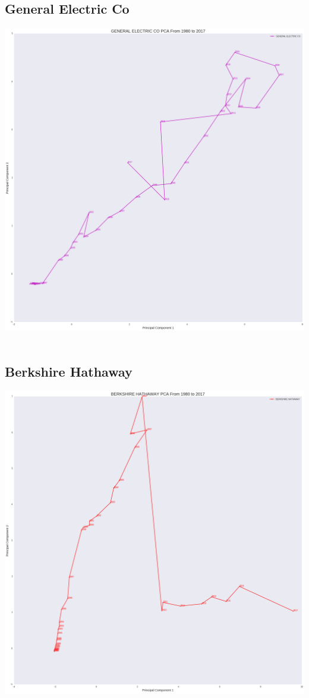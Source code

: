 \subsection{General Electric Co}
\includegraphics[width=1\textwidth]{./GE}\\[0.1in] \\
\subsection{Berkshire Hathaway}
\includegraphics[width=1\textwidth]{./Berkshire_Hathaway}\\[0.1in] \\